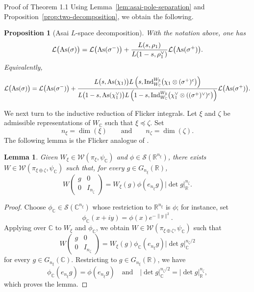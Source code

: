 \documentclass[12pt,reqno]{amsart}
\numberwithin{equation}{section}%
\numberwithin{equation}{subsection}
\newtheorem{prop}[equation]{Proposition}
\newtheorem{lemma}[equation]{Lemma}
\theoremstyle{definition}
\theoremstyle{remark}
\begin{document}
\begin{section}{Proof of Theorem 1.1}
Using Lemma~\ref{lem:asai-pole-separation} and Proposition~\ref{prop:two-decomposition}, we obtain the following.

\begin{prop}[Asai \(L\)-space decomposition]
\label{prop:asai-L-space-decomposition}
With the notation above, one has
\[
\mathcal{L}\bigl({\rm As}(\sigma)\bigr)
=
\mathcal{L}\bigl({\rm As}(\sigma^-)\bigr)
+
\frac{L(s,\rho_1)}{L(1-s,\rho_1^\vee)}
\mathcal{L}\bigl({\rm As}(\sigma^+)\bigr).
\]
Equivalently,
\[
\mathcal{L}\bigl({\rm As}(\sigma)\bigr)
=
\mathcal{L}\bigl({\rm As}(\sigma^-)\bigr)
+
\frac{
L\bigl(s,{\rm As}(\chi_1)\bigr)
L\left(
s,
\operatorname{Ind}_{W_{\mathbb{C}}}^{W_{\mathbb{R}}}
\bigl(\chi_1\otimes(\sigma^+)^c\bigr)
\right)
}{
L\bigl(1-s,{\rm As}(\chi_1^\vee)\bigr)
L\left(
1-s,
\operatorname{Ind}_{W_{\mathbb{C}}}^{W_{\mathbb{R}}}
\bigl(\chi_1^\vee\otimes((\sigma^+)^\vee)^c\bigr)
\right)
}
\mathcal{L}\bigl({\rm As}(\sigma^+)\bigr).
\]
\end{prop}

We next turn to the inductive reduction of Flicker integrals. Let $\xi$
and $\zeta$ be admissible representations of $W_{\mathbb{C}}$ such that  $\xi\preceq\zeta$.
Set
\[
n_\xi=\dim(\xi)
\qquad\text{and}\qquad
n_\zeta=\dim(\zeta).
\]
The following lemma is the Flicker analogue of
\cite[Proposition~14.1]{Jac2009}.

\begin{lemma}
\label{lem:whittaker-replacement}
Given
$W_\xi\in\mathcal{W}(\pi_\xi,\psi_{\mathbb{C}})$ and
$\phi\in\mathcal{S}(\mathbb{R}^{n_\xi})$, there exists
$W\in\mathcal{W}(\pi_{\xi\oplus\zeta},\psi_{\mathbb{C}})$ such that,
for every $g\in G_{n_\xi}(\mathbb{R})$,
\[
W
\begin{pmatrix}
g&0\\
0&I_{n_\zeta}
\end{pmatrix}
=
W_\xi(g)\phi(e_{n_\xi}g)
|\det g|_{\mathbb{R}}^{n_\zeta}.
\]
\end{lemma}

\begin{proof}
Choose $\phi_\mathbb{C}\in \mathcal{S}(\mathbb{C}^{n_\xi})$ whose restriction to
$\mathbb{R}^{n_\xi}$ is $\phi$; for instance, set
\[
\phi_\mathbb{C}(x+iy)=\phi(x)e^{-\lVert y\rVert^2}.
\]
Applying \cite[Proposition~14.1]{Jac2009} over $\mathbb{C}$ to $W_\xi$ and $\phi_\mathbb{C}$, we obtain
$W\in\mathcal{W}(\pi_{\xi\oplus\zeta},\psi_{\mathbb{C}})$ such that
\[
W\begin{pmatrix}
g&0\\
0&I_{n_\zeta}
\end{pmatrix}
=
W_\xi(g)\phi_\mathbb{C}(e_{n_\xi}g)
\lvert\det g\rvert_{\mathbb{C}}^{n_\zeta/2}
\]
for every $g\in G_{n_\xi}(\mathbb{C})$. Restricting to
$g\in G_{n_\xi}(\mathbb{R})$, we have
\[
\phi_\mathbb{C}(e_{n_\xi}g)=\phi(e_{n_\xi}g)
\quad\text{and}\quad
\lvert\det g\rvert_{\mathbb{C}}^{n_\zeta/2}
=
\lvert\det g\rvert_{\mathbb{R}}^{n_\zeta},
\]
which proves the lemma.
\end{proof}


\end{section}
\end{document}

